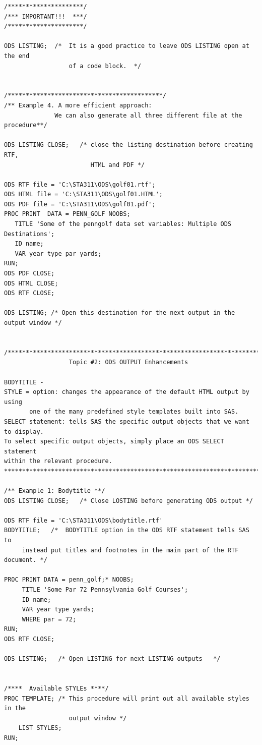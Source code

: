 \documentclass[
]{book}
\begin{document}
\begin{verbatim}
/*********************/
/*** IMPORTANT!!!  ***/
/*********************/

ODS LISTING;  /*  It is a good practice to leave ODS LISTING open at the end 
                  of a code block.  */


/*******************************************/
/** Example 4. A more efficient approach: 
              We can also generate all three different file at the procedure**/

ODS LISTING CLOSE;   /* close the listing destination before creating RTF,
                        HTML and PDF */

ODS RTF file = 'C:\STA311\ODS\golf01.rtf';
ODS HTML file = 'C:\STA311\ODS\golf01.HTML';
ODS PDF file = 'C:\STA311\ODS\golf01.pdf';
PROC PRINT  DATA = PENN_GOLF NOOBS;
   TITLE 'Some of the penngolf data set variables: Multiple ODS Destinations';
   ID name;
   VAR year type par yards;
RUN;
ODS PDF CLOSE;
ODS HTML CLOSE;
ODS RTF CLOSE;

ODS LISTING; /* Open this destination for the next output in the output window */


/***************************************************************************
                  Topic #2: ODS OUTPUT Enhancements

BODYTITLE -
STYLE = option: changes the appearance of the default HTML output by using 
       one of the many predefined style templates built into SAS.
SELECT statement: tells SAS the specific output objects that we want to display. 
To select specific output objects, simply place an ODS SELECT statement 
within the relevant procedure.
****************************************************************************/

/** Example 1: Bodytitle **/
ODS LISTING CLOSE;   /* Close LOSTING before generating ODS output */

ODS RTF file = 'C:\STA311\ODS\bodytitle.rtf'
BODYTITLE;   /*  BODYTITLE option in the ODS RTF statement tells SAS to 
     instead put titles and footnotes in the main part of the RTF document. */  
   
PROC PRINT DATA = penn_golf;* NOOBS;
     TITLE 'Some Par 72 Pennsylvania Golf Courses';
     ID name;
     VAR year type yards;
     WHERE par = 72;
RUN;
ODS RTF CLOSE;

ODS LISTING;   /* Open LISTING for next LISTING outputs   */


/****  Available STYLEs ****/
PROC TEMPLATE; /* This procedure will print out all available styles in the 
                  output window */
    LIST STYLES;
RUN;


\end{verbatim}
\end{document}
